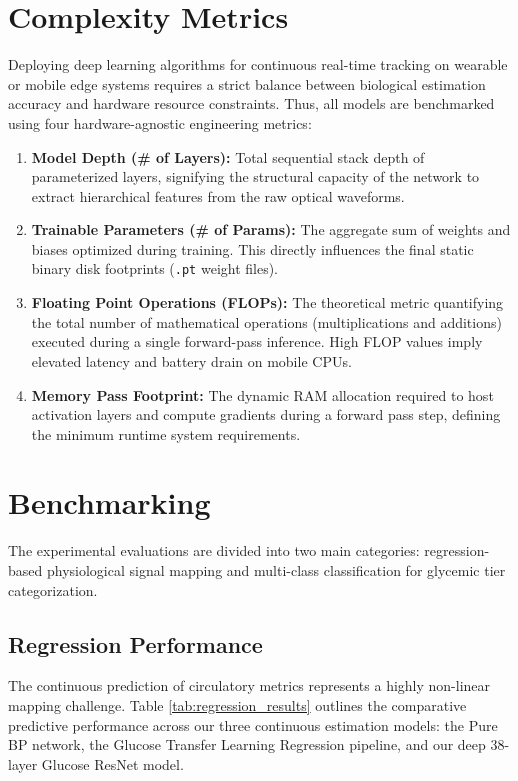 \section{Complexity Metrics}
Deploying deep learning algorithms for continuous real-time tracking on wearable or mobile edge systems requires a strict balance between biological estimation accuracy and hardware resource constraints. Thus, all models are benchmarked using four hardware-agnostic engineering metrics:
\begin{enumerate}
    \item \textbf{Model Depth (\# of Layers):} Total sequential stack depth of parameterized layers, signifying the structural capacity of the network to extract hierarchical features from the raw optical waveforms.
    \item \textbf{Trainable Parameters (\# of Params):} The aggregate sum of weights and biases optimized during training. This directly influences the final static binary disk footprints (\texttt{.pt} weight files).
    \item \textbf{Floating Point Operations (FLOPs):} The theoretical metric quantifying the total number of mathematical operations (multiplications and additions) executed during a single forward-pass inference. High FLOP values imply elevated latency and battery drain on mobile CPUs.
    \item \textbf{Memory Pass Footprint:} The dynamic RAM allocation required to host activation layers and compute gradients during a forward pass step, defining the minimum runtime system requirements.
\end{enumerate}

\section{Benchmarking}
The experimental evaluations are divided into two main categories: regression-based physiological signal mapping and multi-class classification for glycemic tier categorization. 

\subsection{Regression Performance}
The continuous prediction of circulatory metrics represents a highly non-linear mapping challenge. Table \ref{tab:regression_results} outlines the comparative predictive performance across our three continuous estimation models: the Pure BP network, the Glucose Transfer Learning Regression pipeline, and our deep 38-layer Glucose ResNet model.

